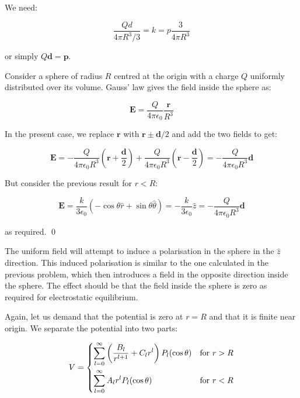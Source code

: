 \documentclass[12pt]{article}
\begin{document}
We need:

\begin{equation}
    \frac{Qd}{4\pi R^{3}/3} = k = p \frac{3}{4\pi R^{3}}
\end{equation}

or simply $Q\mathbf{d} = \mathbf{p}$.

Consider a sphere of radius $R$ centred at the origin with a charge $Q$ uniformly distributed over its volume. Gauss' law gives the field inside the sphere as:

\begin{equation}
    \mathbf{E} = \frac{Q}{4\pi\epsilon_{0}} \frac{\mathbf{r}}{R^{3}}
\end{equation}

In the present case, we replace $\mathbf{r}$ with $\mathbf{r} \pm \mathbf{d}/2$ and add the two fields to get:

\begin{equation}
    \mathbf{E} = -\frac{Q}{4\pi\epsilon_{0}R^{3}} \left( \mathbf{r} + \frac{\mathbf{d}}{2} \right) + \frac{Q}{4\pi\epsilon_{0}R^{3}} \left( \mathbf{r} - \frac{\mathbf{d}}{2} \right) = -\frac{Q}{4\pi\epsilon_{0}R^{3}} \mathbf{d}
\end{equation}

But consider the previous result for $r < R$:

\begin{equation}
    \mathbf{E} = \frac{k}{3\epsilon_{0}} \left( -\cos{\theta} \hat{r} + \sin{\theta} \hat{\theta} \right) = -\frac{k}{3\epsilon_{0}} \hat{z} = -\frac{Q}{4\pi\epsilon_{0}R^{3}} \mathbf{d}
\end{equation}

as required.
\qed



The uniform field will attempt to induce a polarisation in the sphere in the $\hat{z}$ direction. This induced polarisation is similar to the one calculated in the previous problem, which then introduces a field in the opposite direction inside the sphere. The effect should be that the field inside the sphere is zero as required for electrostatic equilibrium.

Again, let us demand that the potential is zero at $r = R$ and that it is finite near origin. We separate the potential into two parts:

\begin{equation}
    V =
    \begin{dcases}
        \sum_{l=0}^{\infty} \left( \frac{B_{l}}{r^{l+1}} + C_{l} r^{l} \right) P_{l}(\cos{\theta}) & \text{for } r > R \\
        \sum_{l=0}^{\infty} A_{l} r^{l} P_{l}(\cos{\theta})                                        & \text{for } r < R
    \end{dcases}
\end{equation}
\end{document}
